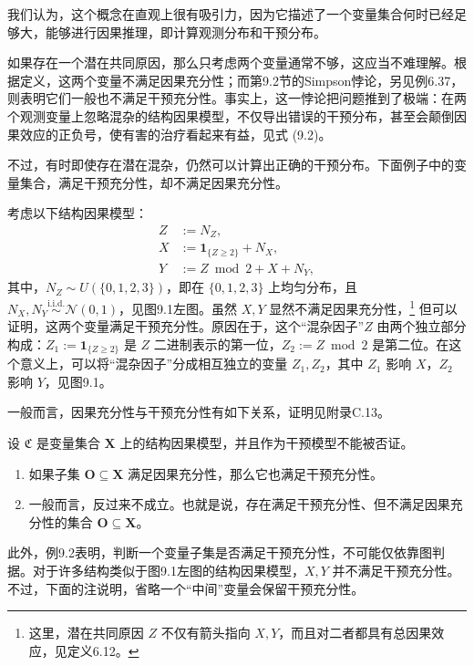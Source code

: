 我们认为，这个概念在直观上很有吸引力，因为它描述了一个变量集合何时已经足够大，能够进行因果推理，即计算观测分布和干预分布。

如果存在一个潜在共同原因，那么只考虑两个变量通常不够，这应当不难理解。根据定义，这两个变量不满足因果充分性；而第9.2节的Simpson悖论，另见例6.37，则表明它们一般也不满足干预充分性。事实上，这一悖论把问题推到了极端：在两个观测变量上忽略混杂的结构因果模型，不仅导出错误的干预分布，甚至会颠倒因果效应的正负号，使有害的治疗看起来有益，见式 (9.2)。

不过，有时即使存在潜在混杂，仍然可以计算出正确的干预分布。下面例子中的变量集合，满足干预充分性，却不满足因果充分性。

\begin{example}
考虑以下结构因果模型：
\[
 \begin{aligned}
 Z&:=N_Z,\\
 X&:=\mathbf1_{\{Z\geq2\}}+N_X,\\
 Y&:=Z\bmod2+X+N_Y,
 \end{aligned}
\]
其中，$N_Z\sim U(\{0,1,2,3\})$，即在 $\{0,1,2,3\}$ 上均匀分布，且 $N_X,N_Y\overset{\mathrm{i.i.d.}}{\sim}\mathcal N(0,1)$，见图9.1左图。虽然 $X,Y$ 显然不满足因果充分性，\footnote{这里，潜在共同原因 $Z$ 不仅有箭头指向 $X,Y$，而且对二者都具有总因果效应，见定义6.12。}
但可以证明，这两个变量满足干预充分性。原因在于，这个“混杂因子”$Z$ 由两个独立部分构成：$Z_1:=\mathbf1_{\{Z\geq2\}}$ 是 $Z$ 二进制表示的第一位，$Z_2:=Z\bmod2$ 是第二位。在这个意义上，可以将“混杂因子”分成相互独立的变量 $Z_1,Z_2$，其中 $Z_1$ 影响 $X$，$Z_2$ 影响 $Y$，见图9.1。
\end{example}



一般而言，因果充分性与干预充分性有如下关系，证明见附录C.13。

\begin{proposition}[干预充分性与因果充分性]
设 $\mathfrak C$ 是变量集合 $\mathbf X$ 上的结构因果模型，并且作为干预模型不能被否证。
\begin{enumerate}[label=(\roman*)]
 \item 如果子集 $\mathbf O\subseteq\mathbf X$ 满足因果充分性，那么它也满足干预充分性。
 \item 一般而言，反过来不成立。也就是说，存在满足干预充分性、但不满足因果充分性的集合 $\mathbf O\subseteq\mathbf X$。
\end{enumerate}
\end{proposition}

此外，例9.2表明，判断一个变量子集是否满足干预充分性，不可能仅依靠图判据。对于许多结构类似于图9.1左图的结构因果模型，$X,Y$ 并不满足干预充分性。不过，下面的注说明，省略一个“中间”变量会保留干预充分性。


